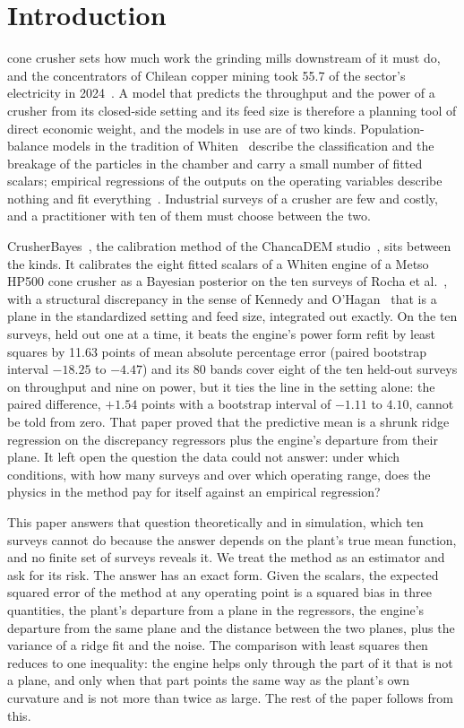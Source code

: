 \section{Introduction}\label{sec:intro}

 cone crusher sets how much work the grinding mills downstream of it must do, and the concentrators of
Chilean copper mining took 55.7\pct{} of the sector's electricity in 2024~\cite{cochilco}. A model that predicts the
throughput and the power of a crusher from its closed-side setting and its feed size is therefore a planning tool of
direct economic weight, and the models in use are of two kinds. Population-balance models in the tradition of
Whiten~\cite{whiten,napier} describe the classification and the breakage of the particles in the chamber and carry a small
number of fitted scalars; empirical regressions of the outputs on the operating variables describe nothing and fit
everything~\cite{yamashita}. Industrial surveys of a crusher are few and costly, and a practitioner with ten of them must
choose between the two.

CrusherBayes~\cite{cb002}, the calibration method of the ChancaDEM studio~\cite{chancadem}, sits between the kinds. It
calibrates the eight fitted scalars of a Whiten engine of a Metso HP500 cone crusher as a Bayesian posterior on the ten
surveys of Rocha et al.~\cite{rocha}, with a structural discrepancy in the sense of Kennedy and O'Hagan~\cite{ko} that is a
plane in the standardized setting and feed size, integrated out exactly. On the ten surveys, held out one at a time, it
beats the engine's power form refit by least squares by 11.63 points of mean absolute percentage error (paired bootstrap
interval $-18.25$ to $-4.47$) and its 80\pct{} bands cover eight of the ten held-out surveys on throughput and nine on power, but it ties the
line in the setting alone: the paired difference, $+1.54$
points with a bootstrap interval of $-1.11$ to $4.10$, cannot be told from zero. That paper proved that the predictive mean
is a shrunk ridge regression on the discrepancy regressors plus the engine's departure from their plane. It left open the
question the data could not answer: under which conditions, with how many surveys and over which operating range, does the
physics in the method pay for itself against an empirical regression?

This paper answers that question theoretically and in simulation, which ten surveys cannot do because the answer depends on
the plant's true mean function, and no finite set of surveys reveals it. We treat the method as an estimator and ask for its
risk. The answer has an exact form. Given the scalars, the expected squared error of the method at any operating point is a
squared bias in three quantities, the plant's departure from a plane in the regressors, the engine's departure from the same
plane and the distance between the two planes, plus the variance of a ridge fit and the noise. The comparison with least
squares then reduces to one inequality: the engine helps only through the part of it that is not a plane, and only when that
part points the same way as the plant's own curvature and is not more than twice as large. The rest of the paper follows from
this.

